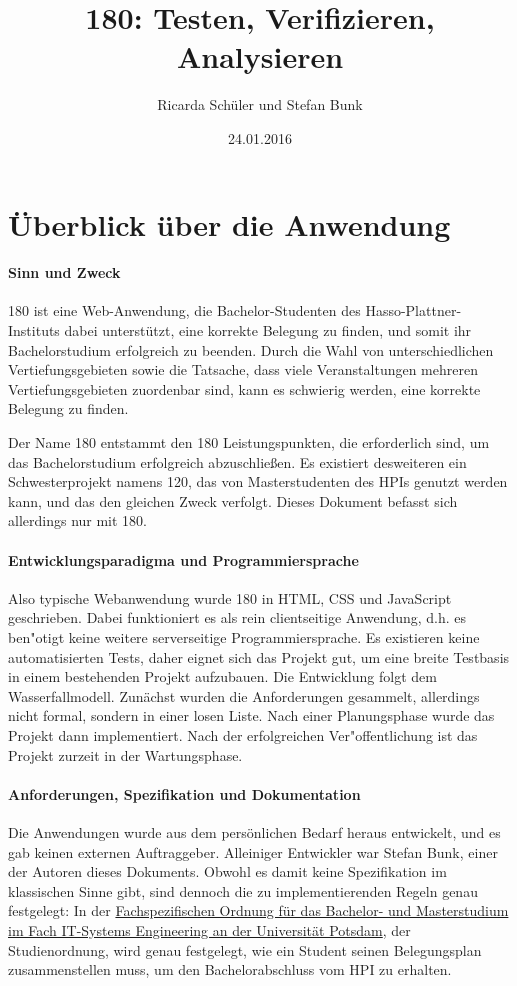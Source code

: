 \documentclass[ngerman]{article}
\title{180: Testen, Verifizieren, Analysieren}
\author{Ricarda Schüler und Stefan Bunk}
\date{24.01.2016}
\begin{document}
\listoftodos
\tableofcontents

\section{Überblick über die Anwendung}
\label{sec:ueberblick}

\paragraph{Sinn und Zweck}

180 ist eine Web-Anwendung, die Bachelor-Studenten des Hasso-Plattner-Instituts dabei unterstützt, eine korrekte Belegung zu finden, und somit ihr Bachelorstudium erfolgreich zu beenden.
Durch die Wahl von unterschiedlichen Vertiefungsgebieten sowie die Tatsache, dass viele Veranstaltungen mehreren Vertiefungsgebieten zuordenbar sind, kann es schwierig werden, eine korrekte Belegung zu finden.

Der Name 180 entstammt den 180 Leistungspunkten, die erforderlich sind, um das Bachelorstudium erfolgreich abzuschließen.
Es existiert desweiteren ein Schwesterprojekt namens 120, das von Masterstudenten des HPIs genutzt werden kann, und das den gleichen Zweck verfolgt.
Dieses Dokument befasst sich allerdings nur mit 180.

\paragraph{Entwicklungsparadigma und Programmiersprache}

Also typische Webanwendung wurde 180 in HTML, CSS und JavaScript geschrieben.
Dabei funktioniert es als rein clientseitige Anwendung, d.h. es ben"otigt keine weitere serverseitige Programmiersprache.
Es existieren keine automatisierten Tests, daher eignet sich das Projekt gut, um eine breite Testbasis in einem bestehenden Projekt aufzubauen.
Die Entwicklung folgt dem Wasserfallmodell.
Zunächst wurden die Anforderungen gesammelt, allerdings nicht formal, sondern in einer losen Liste.
Nach einer Planungsphase wurde das Projekt dann implementiert.
Nach der erfolgreichen Ver"offentlichung ist das Projekt zurzeit in der Wartungsphase.

\paragraph{Anforderungen, Spezifikation und Dokumentation}

Die Anwendungen wurde aus dem persönlichen Bedarf heraus entwickelt, und es gab keinen externen Auftraggeber.
Alleiniger Entwickler war Stefan Bunk, einer der Autoren dieses Dokuments.
Obwohl es damit keine Spezifikation im klassischen Sinne gibt, sind dennoch die zu implementierenden Regeln genau festgelegt:
In der \href{http://www.uni-potsdam.de/ambek/ambek2010/15/Seite3.pdf}{Fachspezifischen Ordnung für das Bachelor- und Masterstudium im Fach IT-Systems Engineering an der Universität Potsdam}, der Studienordnung, wird genau festgelegt, wie ein Student seinen Belegungsplan zusammenstellen muss, um den Bachelorabschluss vom HPI zu erhalten.
\end{document}
